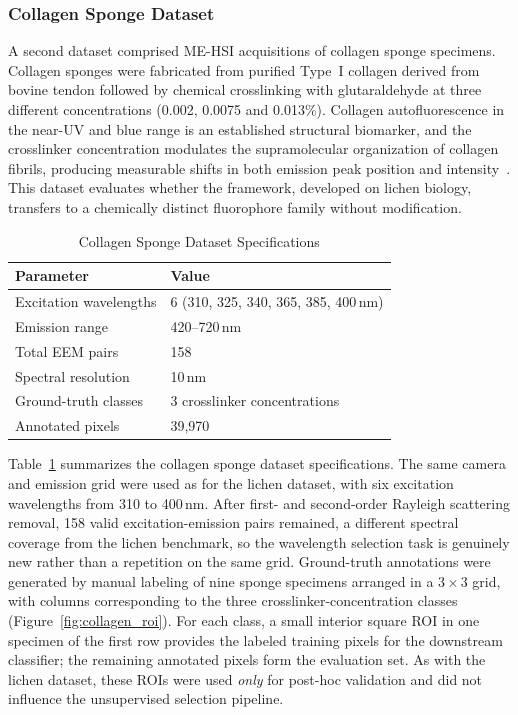 \subsubsection{Collagen Sponge Dataset}
\label{sec:dataset_collagen}

A second dataset comprised ME-HSI acquisitions of collagen sponge specimens. Collagen sponges were fabricated from purified Type~I collagen derived from bovine tendon followed by chemical crosslinking with glutaraldehyde at three different concentrations (0.002, 0.0075 and 0.013\%).
Collagen autofluorescence in the near-UV and blue range is an established structural biomarker, and the crosslinker concentration modulates the supramolecular organization of collagen fibrils, producing measurable shifts in both emission peak position and intensity~\cite{lakowicz2006principles}.
This dataset evaluates whether the framework, developed on lichen biology, transfers to a chemically distinct fluorophore family without modification.

\begin{table}[!t]
\centering
\caption{Collagen Sponge Dataset Specifications}
\label{tab:dataset_collagen}
\begin{tabular}{@{}ll@{}}
\toprule
\textbf{Parameter} & \textbf{Value} \\
\midrule
Excitation wavelengths & 6 (310, 325, 340, 365, 385, 400\,nm) \\
Emission range & 420--720\,nm \\
Total EEM pairs & 158 \\
Spectral resolution & 10\,nm \\
Ground-truth classes & 3 crosslinker concentrations \\
Annotated pixels & 39{,}970 \\
\bottomrule
\end{tabular}
\end{table}

Table~\ref{tab:dataset_collagen} summarizes the collagen sponge dataset specifications.
The same camera and emission grid were used as for the lichen dataset, with six excitation wavelengths from 310 to 400\,nm. After first- and second-order Rayleigh scattering removal, 158 valid excitation-emission pairs remained, a different spectral coverage from the lichen benchmark, so the wavelength selection task is genuinely new rather than a repetition on the same grid.
Ground-truth annotations were generated by manual labeling of nine sponge specimens arranged in a $3 \times 3$ grid, with columns corresponding to the three crosslinker-concentration classes (Figure~\ref{fig:collagen_roi}).
For each class, a small interior square ROI in one specimen of the first row provides the labeled training pixels for the downstream classifier; the remaining annotated pixels form the evaluation set.
As with the lichen dataset, these ROIs were used \emph{only} for post-hoc validation and did not influence the unsupervised selection pipeline.

